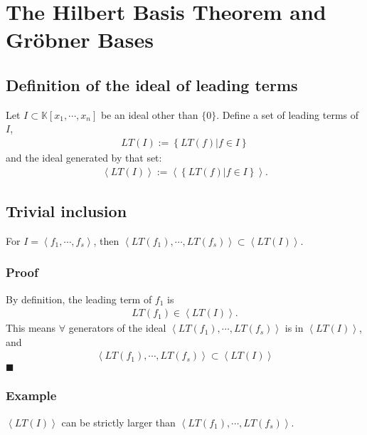 \documentclass[11pt]{book}
\begin{document}


\section{The Hilbert Basis Theorem and Gr\"obner Bases}
\subsection{Definition of the ideal of leading terms}
Let $I \subset \mathbb{K}[x_1, \cdots, x_{n}]$ be an ideal other than $\{0\}$.
Define a set of leading terms of $I$, 
\begin{eqnarray}
LT(I) := \left\{ \left. LT(f) \right| f \in I \right\} 
\end{eqnarray}
and the ideal generated by that set:
\begin{eqnarray}
\left< LT(I) \right>  := \left< \left\{ \left. LT(f) \right| f \in I \right\} \right>.
\end{eqnarray}

\subsection{Trivial inclusion}
\label{LargerLemma}
For $I = \left< f_1, \cdots, f_s \right>$, then $\left< LT(f_1), \cdots, LT(f_s) \right> \subset \left< LT(I) \right>$.

\subsubsection{Proof}
By definition, the leading term of $f_1$ is
\begin{eqnarray}
LT(f_1) \in \left< LT(I) \right>.
\end{eqnarray}
This means $\forall$ generators of the ideal $\left< LT(f_1), \cdots, LT(f_s) \right>$ is in $\left< LT(I) \right>$, and
\begin{eqnarray}
\left< LT(f_1), \cdots, LT(f_s) \right> \subset \left< LT(I) \right>
\end{eqnarray}
$\blacksquare$

\subsubsection{Example}
$\left< LT(I) \right>$ can be strictly larger than $\left< LT(f_1), \cdots, LT(f_s) \right>$.
\end{document}

